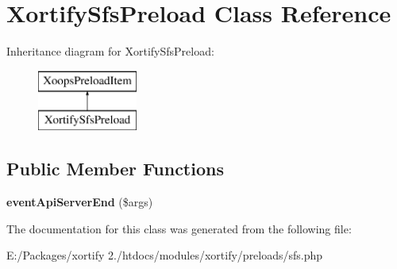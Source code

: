 \hypertarget{class_xortify_sfs_preload}{\section{Xortify\-Sfs\-Preload Class Reference}
\label{class_xortify_sfs_preload}
}
Inheritance diagram for Xortify\-Sfs\-Preload\-:\begin{figure}[H]
\begin{center}
\leavevmode
\includegraphics[height=2.000000cm]{class_xortify_sfs_preload}
\end{center}
\end{figure}
\subsection*{Public Member Functions}
\begin{DoxyCompactItemize}
\item 
\hypertarget{class_xortify_sfs_preload_adc22e04a0640a2ba6264320d6c348ae0}{{\bfseries event\-Api\-Server\-End} (\$args)}\label{class_xortify_sfs_preload_adc22e04a0640a2ba6264320d6c348ae0}

\end{DoxyCompactItemize}


The documentation for this class was generated from the following file\-:\begin{DoxyCompactItemize}
\item 
E\-:/\-Packages/xortify 2./htdocs/modules/xortify/preloads/sfs.\-php\end{DoxyCompactItemize}
